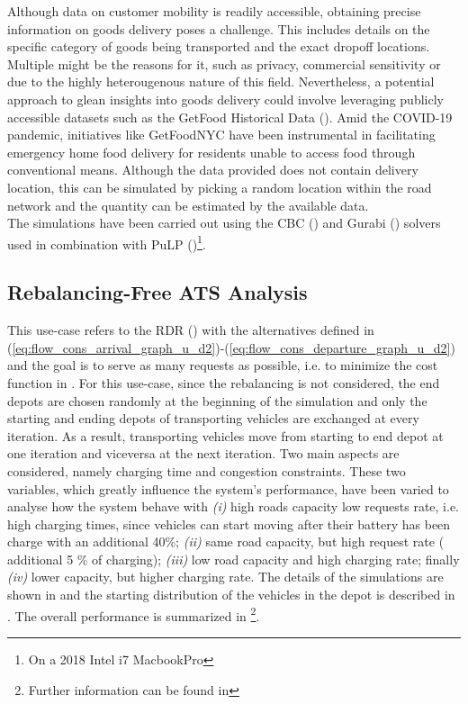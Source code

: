 Although data on customer mobility is readily accessible, obtaining precise information on goods delivery poses a challenge. This includes details on the specific category of goods being transported and the exact dropoff locations. Multiple might be the reasons for it, such as privacy, commercial sensitivity or due to the highly heterougenous nature of this field. Nevertheless, a potential approach to glean insights into goods delivery could involve leveraging publicly accessible datasets such as the GetFood Historical Data (\cite{getfoodnyc}). Amid the COVID-19 pandemic, initiatives like GetFoodNYC have been instrumental in facilitating emergency home food delivery for residents unable to access food through conventional means. Although the data provided does not contain delivery location, this can be simulated by picking a random location within the road network and the quantity can be estimated by the available data.\\
The simulations have been carried out using the CBC (\cite{schumacher2022rcbc}) and Gurabi (\cite{gurobi}) solvers used in combination with PuLP (\cite{dunning2011pulp})\footnote{On a 2018 Intel i7 MacbookPro}. 


\subsection{Rebalancing-Free ATS Analysis}
This use-case refers to the RDR () with the alternatives defined in (\ref{eq:flow_cons_arrival_graph_u_d2})-(\ref{eq:flow_cons_departure_graph_u_d2}) and the goal is to serve as many requests as possible, i.e. to minimize the cost function in .  For this use-case, since the rebalancing is not considered, the end depots are chosen randomly at the beginning of the simulation and only the starting and ending depots of transporting vehicles are exchanged at every iteration. As a result, transporting vehicles move from starting to end depot at one iteration and viceversa at the next iteration. Two main aspects are considered, namely charging time and congestion constraints. These two variables, which greatly influence the system's performance, have been varied to analyse how the system behave with \textit{(i)} high roads capacity low requests rate, i.e. high charging times, since vehicles can start moving after their battery has been charge with an additional 40\%; \textit{(ii)} same road capacity, but high request rate ( additional 5 \% of charging); \textit{(iii)} low road capacity and high charging rate; finally \textit{(iv)} lower capacity, but higher charging rate. 
 The details of the simulations are shown in  and the starting distribution of the vehicles in the depot is described in . The overall performance is summarized in \footnote{Further information can be found in  
 }.  \\




